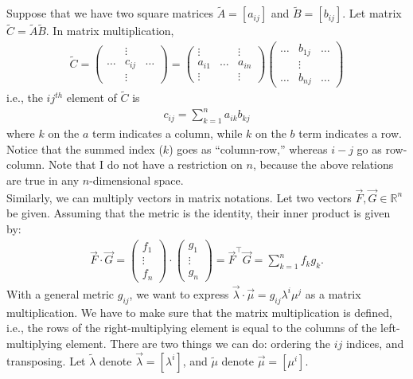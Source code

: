 \documentclass{article}
\theoremstyle{definition}
\begin{document}
Suppose that we have two square matrices $\tilde{A} = [a_{ij}]$ and $\tilde{B} = [b_{ij}]$. Let matrix $\tilde{C} = \tilde{A}\tilde{B}$. In matrix multiplication,
\begin{align*}
\boxed{
\tilde{C} = 
\begin{pmatrix}
&\vdots&\\
\dots&c_{ij}&\dots\\
&\vdots&
\end{pmatrix}
=
\begin{pmatrix}
\vdots&&\vdots\\
a_{i1} & \dots & a_{in}\\
\vdots&&\vdots
\end{pmatrix}
\begin{pmatrix}
\dots&b_{1j}&\dots\\
&\vdots&\\
\dots&b_{nj}&\dots
\end{pmatrix}
}
\end{align*} 
i.e., the $ij^{th}$ element of $\tilde{C}$ is 
\begin{align*}
\boxed{c_{ij} = \sum_{k=1}^na_{ik}b_{kj}}
\end{align*}
where $k$ on the $a$ term indicates a column, while $k$ on the $b$ term indicates a row. Notice that the summed index ($k$) goes as ``column-row,'' whereas $i-j$ go as row-column. Note that I do not have a restriction on $n$, because the above relations are true in any $n$-dimensional space. \\

Similarly, we can multiply vectors in matrix notations. Let two vectors $\vec{F}, \vec{G} \in \mathbb{R}^n$ be given. Assuming that the metric is the identity, their inner product is given by:
\begin{align*}
\boxed{
\vec{F}\cdot\vec{G} = 
\begin{pmatrix}
f_1\\
\vdots\\
f_n
\end{pmatrix}\cdot
\begin{pmatrix}
g_1\\
\vdots\\
g_n
\end{pmatrix}
=
\vec{F}^\top\vec{G} 
=
\sum_{k=1}^{n}f_kg_k.
}
\end{align*}
With a general metric $g_{ij}$, we want to express $\vec{\lambda}\cdot\vec{\mu} = g_{ij}\lambda^i\mu^j$ as a matrix multiplication. We have to make sure that the matrix multiplication is defined, i.e., the rows of the right-multiplying element is equal to the columns of the left-multiplying element. There are two things we can do: ordering the $ij$ indices, and transposing. Let $\tilde{\lambda}$ denote $\vec{\lambda} = [\lambda^i]$, and $\tilde{\mu}$ denote $\vec{\mu} = [\mu^i]$.
\end{document}
